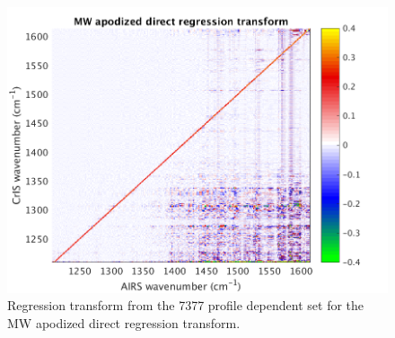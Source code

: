 \documentclass[journal]{IEEEtran}
\begin{document}
\begin{figure} %
  \centering
  \includegraphics[width=\linewidth]{figures/MW_dir_regr_mat.png}
  \caption{Regression transform from the 7377 profile dependent set
    for the MW apodized direct regression transform.}
  \label{dreg3}
\end{figure}

\end{document}

